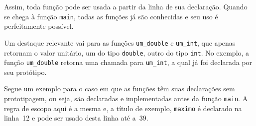 \documentclass[
  11pt,
  a4paper,
]{scrbook}
\begin{document}
Assim, toda função pode ser usada a partir da linha de sua declaração.
Quando se chega à função \texttt{main}, todas as funções já são
conhecidas e seu uso é perfeitamente possível.

Um destaque relevante vai para as funções \texttt{um\_double} e
\texttt{um\_int}, que apenas retornam o valor unitário, um do tipo
\texttt{double}, outro do tipo \texttt{int}. No exemplo, a função
\texttt{um\_double} retorna uma chamada para \texttt{um\_int}, a qual já
foi declarada por seu protótipo.

Segue um exemplo para o caso em que as funções têm suas declarações sem
prototipagem, ou seja, são declaradas e implementadas antes da função
\texttt{main}. A regra de escopo aqui é a mesma e, a título de exemplo,
\texttt{maximo} é declarado na linha~12 e pode ser usado desta linha até
a~39.
\end{document}
